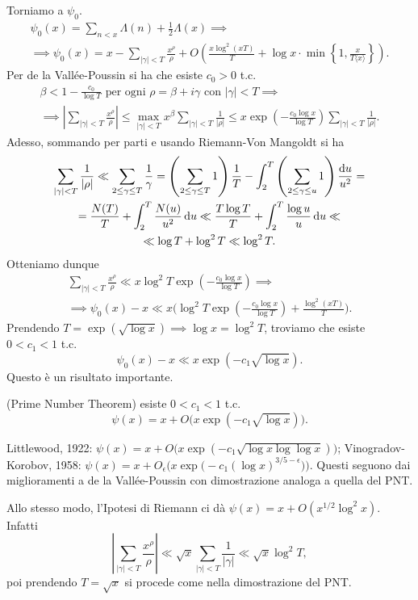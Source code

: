 Torniamo a $\psi_0$.
\begin{gather*}
  \psi_0(x)=\sum_{n<x} \Lambda(n)+\frac{1}{2}\Lambda(x) \implies \\
  \implies \psi_0(x)=x-\sum_{|\gamma|<T} \frac{x^{\rho}}{\rho}+O\left(\frac{x\log^2(xT)}{T}+\log{x}\cdot\min\left\{1,\frac{x}{T\langle x\rangle}\right\}\right).
\end{gather*}
Per de la Vallée-Poussin si ha che esiste $c_0>0$ t.c.
\begin{gather*}
  \beta<1-\frac{c_0}{\log{T}} \text{ per ogni } \rho=\beta+i\gamma \text{ con } |\gamma|<T \implies \\
  \implies \left|\sum_{|\gamma|<T} \frac{x^{\rho}}{\rho}\right| \le \max_{|\gamma|<T} x^{\beta} \sum_{|\gamma|<T} \frac{1}{|\rho|} \le x\exp\left(-\frac{c_0\log{x}}{\log{T}}\right)\sum_{|\gamma|<T} \frac{1}{|\rho|}.
\end{gather*}
Adesso, sommando per parti e usando Riemann-Von Mangoldt si ha
\begin{gather*}
  \sum_{|\gamma|<T} \frac{1}{|\rho|} \ll \sum_{2 \le \gamma \le T} \frac{1}{\gamma}=\left(\sum_{2 \le \gamma \le T}1\right)\frac{1}{T}-\int_2^T \left(\sum_{2 \le \gamma \le u}1\right)\frac{\mathop{}\!\mathrm{d} u}{u^2}= \\
  =\frac{N(T)}{T}+\int_2^T \frac{N(u)}{u^2}\mathop{}\!\mathrm{d} u \ll \frac{T\log{T}}{T}+\int_2^T \frac{\log{u}}{u}\mathop{}\!\mathrm{d} u \ll \\
  \ll \log{T}+\log^2{T} \ll \log^2{T}.
\end{gather*}
Otteniamo dunque
\begin{gather*}
  \sum_{|\gamma|<T} \frac{x^{\rho}}{\rho} \ll x\log^2{T}\exp\left(-\frac{c_0\log{x}}{\log{T}}\right) \implies \\
  \implies \psi_0(x)-x \ll x\Bigg(\log^2{T}\exp\left(-\frac{c_0\log{x}}{\log{T}}\right)+\frac{\log^2(xT)}{T}\Bigg).
\end{gather*}
Prendendo $T=\exp(\sqrt{\log{x}}) \implies \log{x}=\log^2{T}$, troviamo che esiste $0<c_1<1$ t.c.
$$\psi_0(x)-x \ll x\exp(-c_1\sqrt{\log{x}}).$$
Questo è un risultato importante.

\begin{thm} \label{PNT}
  (Prime Number Theorem) esiste $0<c_1<1$ t.c.
  \begin{equation} \label{pnt}
    \psi(x)=x+O\big(x\exp(-c_1\sqrt{\log{x}})\big).
  \end{equation}
\end{thm}

\begin{oss}
  Littlewood, 1922: $\psi(x)=x+O\big(x\exp(-c_1\sqrt{\log{x}\log\log{x}})\big)$;
  Vinogradov-Korobov, 1958: $\psi(x)=x+O_{\epsilon}\Big(x\exp\big(-c_1(\log{x})^{3/5-\epsilon}\big)\Big)$. Questi seguono dai miglioramenti a de la Vallée-Poussin con dimostrazione analoga a quella del PNT.

  Allo stesso modo, l'Ipotesi di Riemann ci dà $\psi(x)=x+O(x^{1/2}\log^2{x})$. Infatti
  $$\left|\sum_{|\gamma|<T} \frac{x^{\rho}}{\rho}\right| \ll \sqrt{x}\sum_{|\gamma|<T} \frac{1}{|\gamma|} \ll \sqrt{x}\log^2{T},$$
  poi prendendo $T=\sqrt{x}$ si procede come nella dimostrazione del PNT.
\end{oss}

